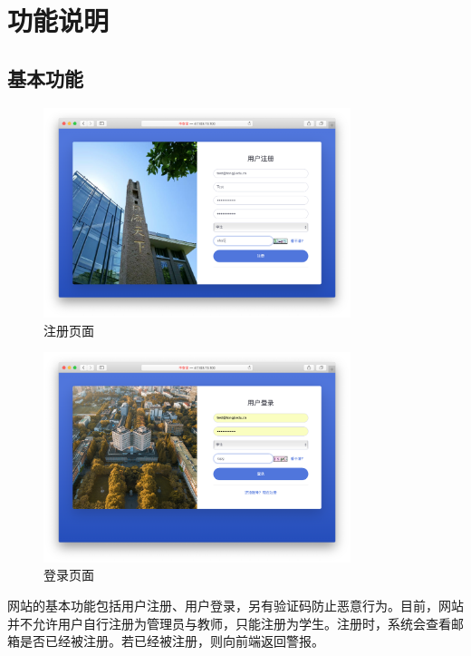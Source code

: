 \documentclass{nwafucoursepaper}
\begin{document}
\newpage

\section{功能说明}

\subsection{基本功能}

\begin{figure}[htp]
  \centering
  \includegraphics[width=0.8\textwidth]{register.png}
  \caption{注册页面}
  \label{register}
\end{figure}

\begin{figure}[htp]
  \centering
  \includegraphics[width=0.8\textwidth]{login.png}
  \caption{登录页面}
  \label{login}
\end{figure}

网站的基本功能包括用户注册、用户登录，另有验证码防止恶意行为。目前，网站并不允许用户自行注册为管理员与教师，只能注册为学生。注册时，系统会查看邮箱是否已经被注册。若已经被注册，则向前端返回警报。
\end{document}
